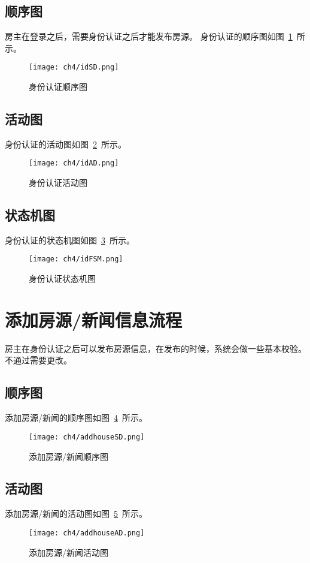 \subsection{顺序图}
房主在登录之后，需要身份认证之后才能发布房源。
身份认证的顺序图如图~\ref{fig:idSD}~所示。
\begin{figure}[htbp]
    \centering
    \texttt{[image: ch4/idSD.png]}
    \caption{身份认证顺序图}\label{fig:idSD}
    \vspace{\baselineskip} %
\end{figure}
\subsection{活动图}
身份认证的活动图如图~\ref{fig:idAD}~所示。
\begin{figure}[htbp]
    \centering
    \texttt{[image: ch4/idAD.png]}
    \caption{身份认证活动图}\label{fig:idAD}
    \vspace{\baselineskip} %
\end{figure}
\subsection{状态机图}
身份认证的状态机图如图~\ref{fig:idFSM}~所示。
\begin{figure}[htbp]
    \centering
    \texttt{[image: ch4/idFSM.png]}
    \caption{身份认证状态机图}\label{fig:idFSM}
    \vspace{\baselineskip} %
\end{figure}

\section{添加房源/新闻信息流程}
房主在身份认证之后可以发布房源信息，在发布的时候，系统会做一些基本校验。不通过需要更改。
\subsection{顺序图}
添加房源/新闻的顺序图如图~\ref{fig:addhouseSD}~所示。
\begin{figure}[htbp]
    \centering
    \texttt{[image: ch4/addhouseSD.png]}
    \caption{添加房源/新闻顺序图}\label{fig:addhouseSD}
    \vspace{\baselineskip} %
\end{figure}
\subsection{活动图}
添加房源/新闻的活动图如图~\ref{fig:addhouseAD}~所示。
\begin{figure}[htbp]
    \centering
    \texttt{[image: ch4/addhouseAD.png]}
    \caption{添加房源/新闻活动图}\label{fig:addhouseAD}
    \vspace{\baselineskip} %
\end{figure}
